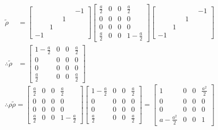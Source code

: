 \documentclass[12pt]{article}
\numberwithin{equation}{section}	 %
\begin{document}
\begin{spacing}{1.5}
\begin{equation}
\end{equation}
\begin{align*}
\tilde{\rho} &= \begin{bmatrix} \quad & \quad & \quad & -1 \\ \quad & \quad & 1 &\quad \\ \quad & 1 & \quad & \quad \\ -1 & \quad & \quad & \quad \end{bmatrix} \begin{bmatrix} \displaystyle \frac{a}{2} & 0 & 0 & \displaystyle \frac{a}{2} \\ 0 & 0 & 0 & 0 \\ 0 & 0 & 0 & 0 \\ \displaystyle \frac{a}{2} & 0 & 0 & \displaystyle 1-\frac{a}{2} \end{bmatrix} \begin{bmatrix} \quad & \quad & \quad & -1 \\ \quad & \quad & 1 &\quad \\ \quad & 1 & \quad & \quad \\ -1 & \quad & \quad & \quad \end{bmatrix} \\
\therefore \tilde{\rho} &= \begin{bmatrix} \displaystyle 1-\frac{a}{2} & 0 & 0 & \displaystyle \frac{a}{2} \\ 0 & 0 & 0 & 0 \\ 0 & 0 & 0 & 0 \\ \displaystyle \frac{a}{2} & 0 & 0 & \displaystyle \frac{a}{2} \end{bmatrix}
\end{align*}
\begin{equation}\nonumber 		%
\therefore \rho\tilde\rho = \begin{bmatrix} \displaystyle \frac{a}{2} & 0 & 0 & \displaystyle \frac{a}{2} \\ 0 & 0 & 0 & 0 \\ 0 & 0 & 0 & 0 \\ \displaystyle \frac{a}{2} & 0 & 0 & \displaystyle 1-\frac{a}{2} \end{bmatrix}  \begin{bmatrix} \displaystyle 1-\frac{a}{2} & 0 & 0 & \displaystyle \frac{a}{2} \\ 0 & 0 & 0 & 0 \\ 0 & 0 & 0 & 0 \\ \displaystyle \frac{a}{2} & 0 & 0 & \displaystyle \frac{a}{2} \end{bmatrix} = \begin{bmatrix} \displaystyle 1 & 0 & 0 & \displaystyle \frac{a^{2}}{2} \\ 0 & 0 & 0 & 0 \\ 0 & 0 & 0 & 0 \\ \displaystyle a-\frac{a^{2}}{2} & 0 & 0 & \displaystyle 1 \end{bmatrix}

\end{equation}
\end{spacing}
\end{document}
